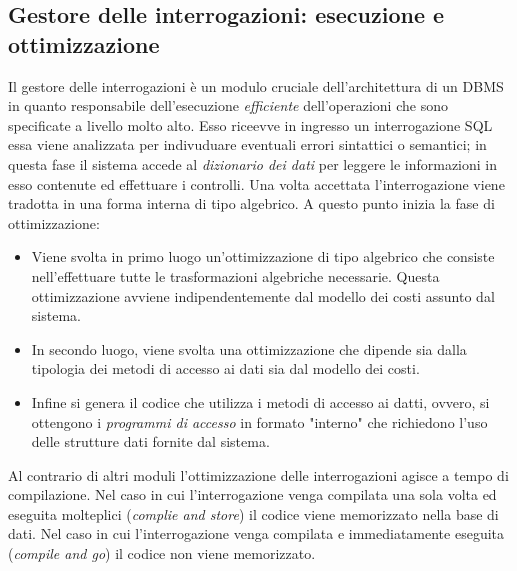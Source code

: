 \subsection{Gestore delle interrogazioni: esecuzione e ottimizzazione}
Il gestore delle interrogazioni è un modulo cruciale dell'architettura di un DBMS in quanto responsabile dell'esecuzione \emph{efficiente} dell'operazioni che sono specificate a livello molto alto. Esso riceevve in ingresso un interrogazione SQL essa viene analizzata per indivuduare eventuali errori sintattici o semantici; in questa fase il sistema accede al \emph{dizionario dei dati} per leggere le informazioni in esso contenute ed effettuare i controlli. Una volta accettata l'interrogazione viene tradotta in una forma interna di tipo algebrico. A questo punto inizia la fase di ottimizzazione:
\begin{itemize}
  \item Viene svolta in primo luogo un'ottimizzazione di tipo algebrico che consiste nell'effettuare tutte le trasformazioni algebriche necessarie. Questa ottimizzazione avviene indipendentemente dal modello dei costi assunto dal sistema.
  \item In secondo luogo, viene svolta una ottimizzazione che dipende sia dalla tipologia dei metodi di accesso ai dati sia dal modello dei costi.
  \item Infine si genera il codice che utilizza i metodi di accesso ai datti, ovvero, si ottengono i \emph{programmi di accesso} in formato "interno" che richiedono l'uso delle strutture dati fornite dal sistema.
\end{itemize}
Al contrario di altri moduli l'ottimizzazione delle interrogazioni agisce a tempo di compilazione. Nel caso in cui l'interrogazione venga compilata una sola volta ed eseguita molteplici (\emph{complie and store}) il codice viene memorizzato nella base di dati. Nel caso in cui l'interrogazione venga compilata e immediatamente eseguita (\emph{compile and go}) il codice non viene memorizzato.
